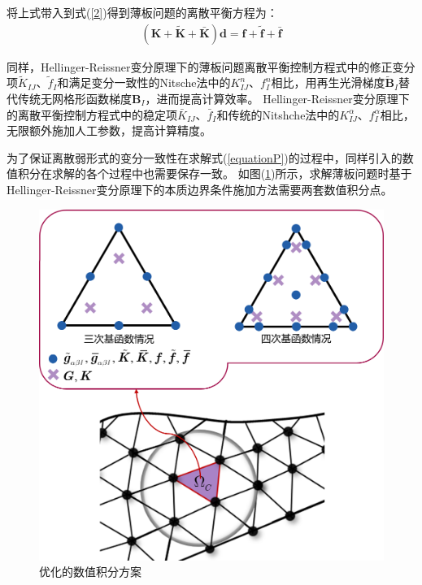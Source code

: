 将上式带入到式(\ref{2})得到薄板问题的离散平衡方程为：
\begin{equation}\label{equationP}
\begin{split}
    (\pmb{K}+\tilde{\pmb K}+\bar{\pmb K})\pmb{d}=\pmb{f}+\tilde{\pmb f}+\bar{\pmb f}
\end{split}
\end{equation}\par
同样，Hellinger-Reissner变分原理下的薄板问题离散平衡控制方程式中的修正变分项$\tilde{K}_{IJ}$、$\tilde{f}_I$和满足变分一致性的Nitsche法中的$K_{IJ}^n$、$f_I^n$相比，用再生光滑梯度$\tilde{\pmb{B}}_I$替代传统无网格形函数梯度$\pmb{B}_I$，进而提高计算效率。
Hellinger-Reissner变分原理下的离散平衡控制方程式中的稳定项$\bar{K}_{IJ}$、$\bar{f}_I$和传统的Nitshche法中的$K^{\alpha}_{IJ}$、$f^{\alpha}_I$相比，无限额外施加人工参数，提高计算精度。\par
为了保证离散弱形式的变分一致性在求解式(\ref{equationP})的过程中，同样引入的数值积分在求解的各个过程中也需要保存一致。
如图(\ref{Pintegralscheme})所示，求解薄板问题时基于Hellinger-Reissner变分原理下的本质边界条件施加方法需要两套数值积分点\cite{}。
\begin{figure}[H]
    \centering
    \includegraphics[scale=0.5]{figure/PHR/Pintegralscheme.png}
    \caption{优化的数值积分方案}\label{Pintegralscheme}
\end{figure}
